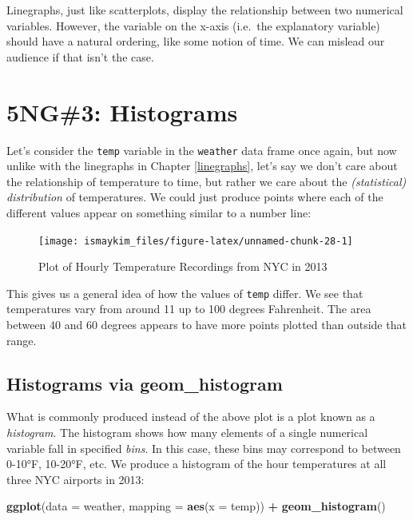 \documentclass[12pt,]{krantz}
\makeatletter
\newenvironment{Shaded}{\begin{snugshade}}{\end{snugshade}}
\newcommand{\KeywordTok}[1]{\textcolor[rgb]{0.27,0.27,0.27}{\textbf{#1}}}
\newcommand{\DataTypeTok}[1]{\textcolor[rgb]{0.27,0.27,0.27}{#1}}
\newcommand{\StringTok}[1]{\textcolor[rgb]{0.5,0.5,0.5}{#1}}
\newcommand{\OperatorTok}[1]{\textcolor[rgb]{0.43,0.43,0.43}{\textbf{#1}}}
\newcommand{\NormalTok}[1]{#1}
\newenvironment{kframe}{%
\medskip{}
\setlength{\fboxsep}{.8em}
 \def\at@end@of@kframe{}%
 \ifinner\ifhmode%
  \def\at@end@of@kframe{\end{minipage}}%
  \begin{minipage}{\columnwidth}%
 \fi\fi%
 \def\FrameCommand##1{\hskip\@totalleftmargin \hskip-\fboxsep
 \colorbox{shadecolor}{##1}\hskip-\fboxsep
     \hskip-\linewidth \hskip-\@totalleftmargin \hskip\columnwidth}%
 \MakeFramed {\advance\hsize-\width
   \@totalleftmargin\z@ \linewidth\hsize
   \@setminipage}}%
 {\par\unskip\endMakeFramed%
 \at@end@of@kframe}
\renewenvironment{Shaded}{\begin{kframe}}{\end{kframe}}
\theoremstyle{definition}
\theoremstyle{definition}
\theoremstyle{definition}
\theoremstyle{remark}
\makeatother
\begin{document}
Linegraphs, just like scatterplots, display the relationship between two
numerical variables. However, the variable on the x-axis (i.e.~the
explanatory variable) should have a natural ordering, like some notion
of time. We can mislead our audience if that isn't the case.

\section{5NG\#3: Histograms}\label{histograms}

Let's consider the \texttt{temp} variable in the \texttt{weather} data
frame once again, but now unlike with the linegraphs in Chapter
\ref{linegraphs}, let's say we don't care about the relationship of
temperature to time, but rather we care about the \emph{(statistical)
distribution} of temperatures. We could just produce points where each
of the different values appear on something similar to a number line:

\begin{figure}

{\centering \texttt{[image: ismaykim\_files/figure-latex/unnamed-chunk-28-1]} 

}

\caption{Plot of Hourly Temperature Recordings from NYC in 2013}\label{fig:unnamed-chunk-28}
\end{figure}

This gives us a general idea of how the values of \texttt{temp} differ.
We see that temperatures vary from around 11 up to 100 degrees
Fahrenheit. The area between 40 and 60 degrees appears to have more
points plotted than outside that range.

\subsection{Histograms via geom\_histogram}\label{geomhistogram}

What is commonly produced instead of the above plot is a plot known as a
\emph{histogram}. The histogram shows how many elements of a single
numerical variable fall in specified \emph{bins}. In this case, these
bins may correspond to between 0-10°F, 10-20°F, etc. We produce a
histogram of the hour temperatures at all three NYC airports in 2013:

\begin{Shaded}
\begin{Highlighting}[]
\KeywordTok{ggplot}\NormalTok{(}\DataTypeTok{data =}\NormalTok{ weather, }\DataTypeTok{mapping =} \KeywordTok{aes}\NormalTok{(}\DataTypeTok{x =}\NormalTok{ temp)) }\OperatorTok{+}
\StringTok{  }\KeywordTok{geom_histogram}\NormalTok{()}
\end{Highlighting}
\end{Shaded}
\end{document}
